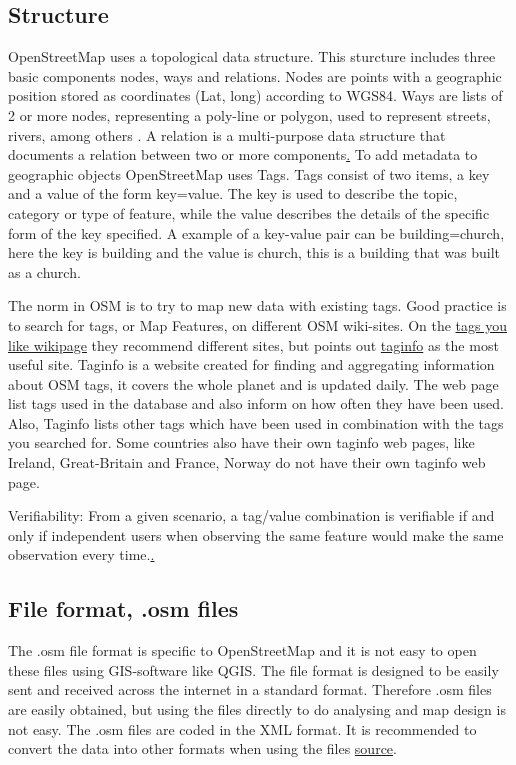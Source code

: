 \subsection{Structure}
OpenStreetMap uses a topological data structure. This sturcture includes three basic components nodes, ways and relations. Nodes are points with a geographic position stored as coordinates (Lat, long) according to WGS84. Ways are lists of 2 or more nodes, representing a poly-line or polygon, used to represent streets, rivers, among others \cite{Debruyne2015}. A relation is a multi-purpose data structure that documents a relation between two or more components\href{https://wiki.openstreetmap.org/wiki/Elements}. To add metadata to geographic objects OpenStreetMap uses Tags. Tags consist of two items, a key and a value of the form key=value. The key is used to describe the topic, category or type of feature, while the value describes the details of the specific form of the key specified. A example of a key-value pair can be building=church, here the key is building and the value is church, this is a building that was built as a church. 

The norm in OSM is to try to map new data with existing tags. Good practice is to search for tags, or Map Features, on different OSM wiki-sites. On the \href{http://wiki.openstreetmap.org/wiki/Any_tags_you_like}{tags you like wikipage} they recommend different sites, but points out \href{http://taginfo.openstreetmap.org/}{taginfo} as the most useful site. Taginfo is a website created for finding and aggregating information about OSM tags, it covers the whole planet and is updated daily. The web page list tags used in the database and also inform on how often they have been used. Also, Taginfo lists other tags which have been used in combination with the tags you searched for. Some countries also have their own taginfo web pages, like Ireland, Great-Britain and France, Norway do not have their own taginfo web page. 

Verifiability: From a given scenario, a tag/value combination is verifiable if and only if independent users when observing the same feature would make the same observation every time.\href{http://wiki.openstreetmap.org/wiki/Verifiability}. 

 \subsection{File format, .osm files}
The .osm file format is specific to OpenStreetMap and it is not easy to open these files using GIS-software like QGIS. The file format is designed to be easily sent and received across the internet in a standard format. Therefore .osm files are easily obtained, but using the files directly to do analysing and map design is not easy. The .osm files are coded in the XML format. It is recommended to convert the data into other formats when using the files \href{http://learnosm.org/en/osm-data/file-formats/}{source}. 






